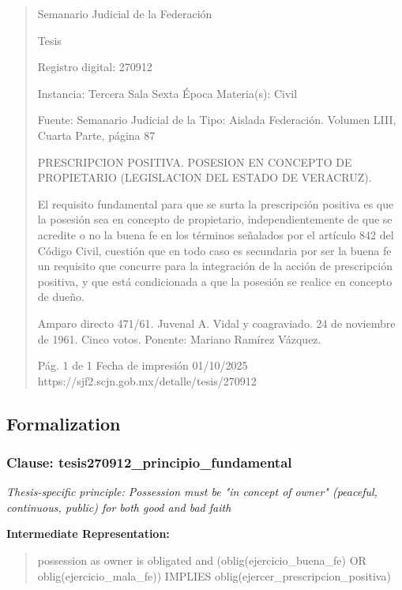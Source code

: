 \documentclass[11pt,a4paper]{article}
\begin{document}
\begin{quote}
                                                   Semanario Judicial de la Federación

                                                  Tesis

 Registro digital: 270912

 Instancia: Tercera Sala          Sexta Época                          Materia(s): Civil

                                  Fuente: Semanario Judicial de la     Tipo: Aislada
                                  Federación.
                                  Volumen LIII, Cuarta Parte, página
                                  87


PRESCRIPCION POSITIVA. POSESION EN CONCEPTO DE PROPIETARIO (LEGISLACION DEL
ESTADO DE VERACRUZ).


El requisito fundamental para que se surta la prescripción positiva es que la posesión sea en
concepto de propietario, independientemente de que se acredite o no la buena fe en los términos
señalados por el artículo 842 del Código Civil, cuestión que en todo caso es secundaria por ser la
buena fe un requisito que concurre para la integración de la acción de prescripción positiva, y que
está condicionada a que la posesión se realice en concepto de dueño.


Amparo directo 471/61. Juvenal A. Vidal y coagraviado. 24 de noviembre de 1961. Cinco votos.
Ponente: Mariano Ramírez Vázquez.




                                             Pág. 1 de 1           Fecha de impresión 01/10/2025
  https://sjf2.scjn.gob.mx/detalle/tesis/270912

\end{quote}

\subsection{Formalization}

\subsubsection{Clause: tesis270912\_principio\_fundamental}

\textit{Thesis-specific principle: Possession must be "in concept of owner" (peaceful, continuous, public) for both good and bad faith}

\textbf{Intermediate Representation:}

\begin{quote}
possession as owner is obligated and (oblig(ejercicio\_buena\_fe) OR oblig(ejercicio\_mala\_fe)) IMPLIES oblig(ejercer\_prescripcion\_positiva)
\end{quote}
\end{document}
